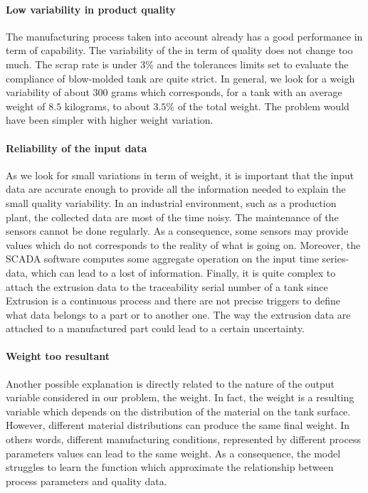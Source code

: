 \paragraph{Low variability in product quality}

The manufacturing process taken into account already has a good performance in term of capability. The variability of the in term of quality does not change too much. The scrap rate is under 3\% and the tolerances limits set to evaluate the compliance of blow-molded tank are quite strict. In general, we look for a weigh variability of about 300 grams which corresponds, for a tank with an average weight of $8.5$ kilograms, to about $3.5\%$ of the total weight. The problem would have been simpler with higher weight variation.     

\paragraph{Reliability of the input data}

As we look for small variations in term of weight, it is important that the input data are accurate enough to provide all the information needed to explain the small quality variability. In an industrial environment, such as a production plant, the collected data are most of the time noisy. The maintenance of the sensors cannot be done regularly. As a consequence, some sensors may provide values which do not corresponds to the reality of what is going on. Moreover, the SCADA software computes some aggregate operation on the input time series-data, which can lead to a lost of information. Finally, it is quite complex to attach the extrusion data to the traceability serial number of a tank since Extrusion is a continuous process and there are not precise triggers to define what data belongs to a part or to another one. The way the extrusion data are attached to a manufactured part could lead to a certain uncertainty.  


\paragraph{Weight too resultant}

Another possible explanation is directly related to the nature of the output variable considered in our problem, the weight. In fact, the weight is a resulting variable which depends on the distribution of the material on the tank surface. However, different material distributions can produce the same final weight. In others words, different manufacturing conditions, represented by different process parameters values can lead to the same weight. As a consequence, the model struggles to learn the function which approximate the relationship between process parameters and quality data.

